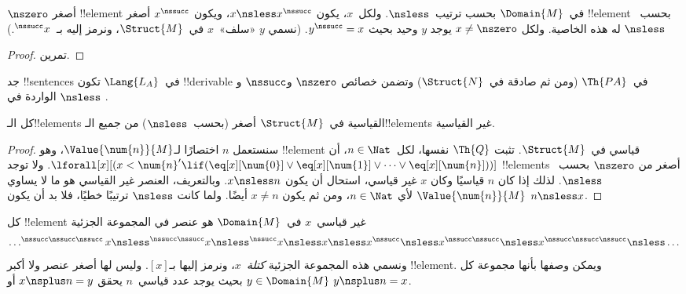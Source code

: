 \documentclass[../../../include/open-logic-section]{subfiles}
\begin{document}
\begin{prop}
 $\nszero$ أصغر !!{element} في~$\Domain{M}$
بحسب ترتيب~$\nsless$. ولكل~$x$، يكون $x \nsless x^\nssucc$، ويكون
$x^\nssucc$ أصغر !!{element} بحسب~$\nsless$ له هذه الخاصية. ولكل
$x \neq \nszero$ يوجد $y$ وحيد بحيث $y^\nssucc = x$. (نسمي $y$
«سلف»~$x$ في~$\Struct{M}$، ونرمز إليه بـ~$^\nssucc x$.)
\end{prop}

\begin{proof}
تمرين.
\end{proof}

\begin{prob}
جد !!{sentence}s في~$\Lang{L_A}$ تكون !!{derivable} في~$\Th{PA}$
(ومن ثم صادقة في~$\Struct{N}$) وتضمن خصائص $\nszero$ و$\nssucc$
و$\nsless$ الواردة في
.
\end{prob}

\begin{prop}
كل الـ!!{element}s القياسية في~$\Struct{M}$ أصغر (بحسب~$\nsless$) من
جميع الـ!!{element}s غير القياسية.
\end{prop}

\begin{proof}
سنستعمل $n$ اختصارًا لـ$\Value{\num{n}}{M}$، وهو !!{element} قياسي
في~$\Struct{M}$. تثبت $\Th{Q}$ نفسها، لكل~$n \in \Nat$، أن
$\lforall[x][(x < \num{n}' \lif (\eq[x][\num{0}] \lor
  \eq[x][\num{1}] \lor \dots \lor \eq[x][\num{n}]))]$. ولا توجد
!!{element}s أصغر من $\nszero$ بحسب~$\nsless$. لذلك إذا كان $n$
قياسيًا وكان $x$ غير قياسي، استحال أن يكون $x \nsless n$. وبالتعريف،
العنصر غير القياسي هو ما لا يساوي $\Value{\num{n}}{M}$ لأي
$n \in \Nat$، ومن ثم يكون $x \neq n$ أيضًا. ولما كانت $\nsless$
ترتيبًا خطيًا، فلا بد أن يكون $n \nsless x$.
\end{proof}

\begin{prop}
كل !!{element} غير قياسي~$x$ في~$\Domain{M}$ هو عنصر في المجموعة الجزئية
\[
\dots ^{\nssucc\nssucc\nssucc}x \nsless ^{\nssucc\nssucc}x \nsless
^{\nssucc}x \nsless x \nsless x^{\nssucc} \nsless x^{\nssucc\nssucc}
\nsless x^{\nssucc\nssucc\nssucc} \nsless \dots
\]
ونسمي هذه المجموعة الجزئية \emph{كتلة~$x$}، ونرمز إليها بـ$[x]$.
وليس لها أصغر عنصر ولا أكبر !!{element}. ويمكن وصفها بأنها مجموعة
كل $y \in \Domain{M}$ بحيث يوجد عدد قياسي~$n$ يحقق
$x \nsplus n = y$ أو $y \nsplus n = x$.
\end{prop}
\end{document}

